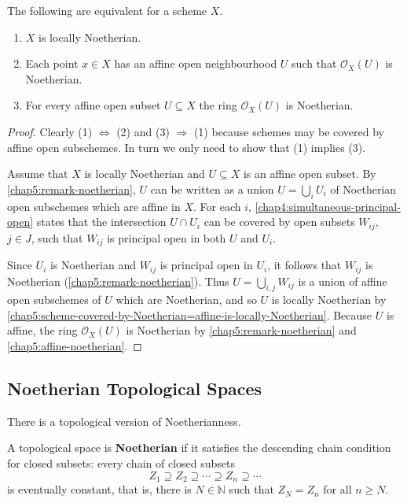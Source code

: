\documentclass[12pt]{book}
\newcommand{\inlinedef}[1]{\textcolor{oxfordblue}{\bfseries #1}}
\theoremstyle{definition}
\newcommand{\NN}{\mathbb N}
\begin{document}
	\begin{proposition}
		The following are equivalent for a scheme $X$.
		\begin{enumerate}
			\item $X$ is locally Noetherian.
			\item Each point $x \in X$ has an affine open neighbourhood $U$ such that $\mathcal{O}_X({U})$ is Noetherian.
			\item For every affine open subset $U \subseteq X$ the ring $\mathcal{O}_X(U)$ is Noetherian.
		\end{enumerate}
	\end{proposition}
	\begin{proof}
		Clearly (1) $\Longleftrightarrow$ (2) and (3) $\Rightarrow$ (1) because schemes may be covered by affine open subschemes. In turn we only need to show that (1) implies (3). 
		
		Assume that $X$ is locally Noetherian and $U \subseteq X$ is an affine open subset. By \cref{chap5:remark-noetherian}, $U$ can be written as a union $U = \bigcup_i U_i$ of Noetherian open subschemes which are affine in $X$. For each $i$, \cref{chap4:simultaneous-principal-open} states that the intersection $U \cap U_i$ can be covered by open subsets $W_{ij}$, $j \in J$, such that $W_{ij}$ is principal open in both $U$ and $U_i$. 
		
		Since $U_i$ is Noetherian and $W_{ij}$ is principal open in $U_i$, it follows that $W_{ij}$ is Noetherian (\cref{chap5:remark-noetherian}). Thus $U = \bigcup_{i,j} W_{ij}$ is a union of affine open subschemes of $U$ which are Noetherian, and so $U$ is locally Noetherian by \cref{chap5:scheme-covered-by-Noetherian=affine-is-locally-Noetherian}. Because $U$ is affine, the ring $\mathcal{O}_X(U)$ is Noetherian by \cref{chap5:remark-noetherian} and \cref{chap5:affine-noetherian}.
	\end{proof}
	
	\subsection*{Noetherian Topological Spaces}
	
	There is a topological version of Noetherianness.
	
	\begin{definition}
		A topological space is \inlinedef{Noetherian} if it satisfies the descending chain condition for closed subsets: every chain of closed subsets
		\begin{equation*}
			Z_1 \supseteq Z_2 \supseteq \dotsb \supseteq Z_n \supseteq \dotsb
		\end{equation*}
		is eventually constant, that is, there is $N \in \NN$ such that $Z_N = Z_n$ for all $n \geq N$.
	\end{definition}
	
\end{document}
